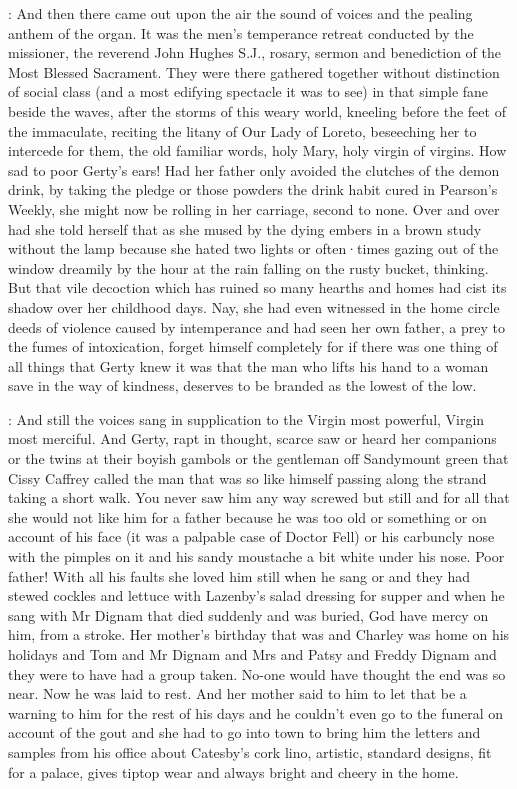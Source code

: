 :
And then there came out upon the air the sound of voices and the
pealing anthem of the organ.
It was the men's temperance retreat conducted
by the missioner,
the reverend John Hughes S.J.,
rosary, sermon and benediction of the Most Blessed Sacrament.
They were there gathered
together without distinction of social class (and a most edifying
spectacle it was to see) in that simple fane beside the waves,
after the storms of this weary world,
kneeling before the feet of
the immaculate,
reciting the litany of Our Lady of Loreto,
beseeching her to intercede for them,
the old familiar words,
holy Mary,
holy virgin of virgins.
How sad to poor Gerty's ears!
Had her father only avoided the clutches of the demon drink,
by taking the pledge or those powders the drink habit cured in Pearson's Weekly,
she might now be rolling in her carriage,
second to none.
Over and over
had she told herself that as she mused by the dying embers in a brown
study without the lamp because she hated two lights or often·times gazing
out of the window dreamily by the hour at the rain falling on the rusty bucket,
thinking.
But that vile decoction which has ruined so many hearths
and homes had cist its shadow over her childhood days.
Nay,
she had even
witnessed in the home circle deeds of violence caused by intemperance and
had seen her own father,
a prey to the fumes of intoxication,
forget
himself completely
for if there was one thing of all things that Gerty
knew it was that the man who lifts his hand to a woman save in the way of
kindness,
deserves to be branded as the lowest of the low.

:
And still the voices sang in supplication to the Virgin most powerful,
Virgin most merciful.
And Gerty,
rapt in thought,
scarce saw or heard her
companions or the twins at their boyish gambols or the gentleman off
Sandymount green that Cissy Caffrey called the man that was so like
himself passing along the strand taking a short walk.
You never saw him
any way screwed but still and for all that she would not like him for a
father because he was too old or something or on account of his face (it
was a palpable case of Doctor Fell)
or his carbuncly nose with the pimples
on it and his sandy moustache a bit white under his nose.
Poor father!
With all his faults she loved him still when he sang
or
 and they had stewed cockles
and lettuce with Lazenby's salad dressing for supper and when he sang
 with Mr Dignam that died suddenly and was buried,
God
have mercy on him,
from a stroke.
Her mother's birthday that was and
Charley was home on his holidays and Tom
and Mr Dignam and Mrs and Patsy and Freddy Dignam
and they were to have had a group taken.
No-one would have thought the end was so near.
Now he was laid to rest.
And her mother said to him
to let that be a warning to him for the rest of
his days and he couldn't even go to the funeral on account of the gout and
she had to go into town to bring him the letters and samples from his
office about Catesby's cork lino,
artistic,
standard designs,
fit for a
palace,
gives tiptop wear and always bright and cheery in the home.

